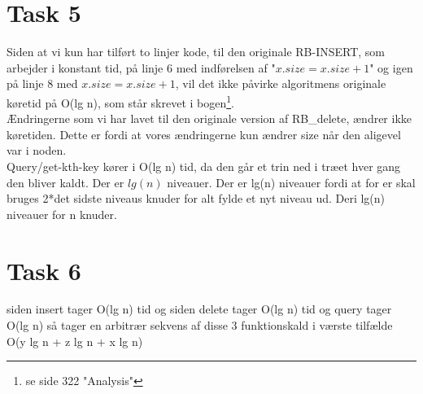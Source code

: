 \documentclass[12pt]{article}
\begin{document}
\section*{Task 5}
Siden at vi kun har tilført to linjer kode, til den originale RB-INSERT, som arbejder i konstant tid, på linje 6 med indførelsen af "$x.size = x.size + 1$" og igen på linje 8 med $x.size = x.size + 1$, vil det ikke påvirke algoritmens originale køretid på O(lg n), som står skrevet i bogen\footnote{se side 322 "Analysis"}.
\\
Ændringerne som vi har lavet til den originale version af RB\_delete, ændrer ikke køretiden. Dette er fordi at vores ændringerne kun ændrer size når den aligevel var i noden.\\
Query/get-kth-key kører i O(lg n) tid, da den går et trin ned i træet hver gang den bliver kaldt. Der er $lg(n)$ niveauer. Der er lg(n) niveauer fordi at for er skal bruges 2*det sidste niveaus knuder for alt fylde et nyt niveau ud. Deri lg(n) niveauer for n knuder.

\section*{Task 6}
siden insert tager O(lg n) tid og siden delete tager O(lg n) tid og query tager O(lg n) så tager en arbitrær sekvens af disse 3 funktionskald i værste tilfælde \\
O(y lg n + z lg n + x lg n)
\end{document}
